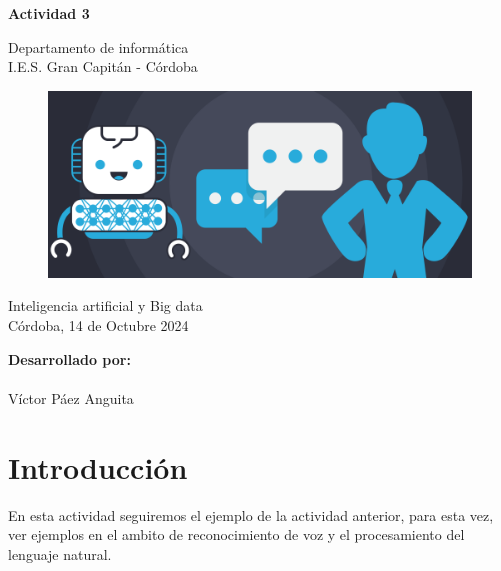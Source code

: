 \documentclass[12pt]{article}
\begin{document}
\begin{titlepage}
    \begin{center}
      \Large \bfseries{}
    \end{center}
    \vspace{0.1cm}
    \begin{center}
      \Large \bfseries{}
    \end{center}
    \vspace{0.1cm}
    \begin{center}
     \Large \bfseries{Actividad 3}
    \end{center}
    \vspace{0.0001cm}
    \begin{center}
        Departamento de informática \\ I.E.S. Gran Capitán - Córdoba
    \end{center}
        \vspace{2 cm}
\begin{figure}[h!]
    \centering
    \includegraphics[width=.8\textwidth]{portada.png}
    \label{fig:my_label}
\end{figure}
    \vspace{0.2 cm}
    \begin{center}
        Inteligencia artificial y Big data \\ Córdoba, 14 de Octubre 2024
    \end{center}
    \vspace{4 cm}
\null\hfill \textbf{Desarrollado por:}
\\
\\
\null\hfill Víctor Páez Anguita
\clearpage
\end{titlepage}

\tableofcontents
\clearpage

\section{Introducción}
En esta actividad seguiremos el ejemplo de la actividad anterior, para esta vez, ver ejemplos en el ambito de reconocimiento de voz y el procesamiento del lenguaje natural.
\end{document}
